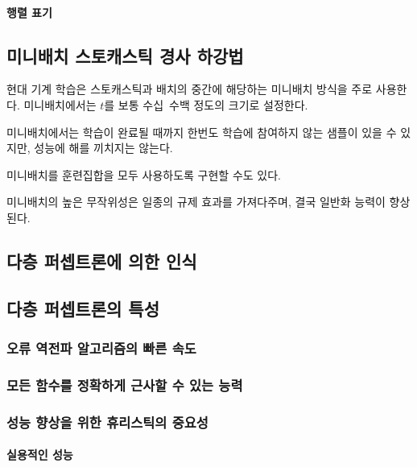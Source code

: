\documentclass [12pt] {oblivoir}
\let\oldsubsubsection=\subsubsection
\renewcommand{\subsubsection}
{
  \filbreak
  \oldsubsubsection
}
\begin{document}
\paragraph*{행렬 표기}\mbox{}

\subsection{미니배치 스토캐스틱 경사 하강법}

현대 기계 학습은 스토캐스틱과 배치의 중간에 해당하는 미니배치 방식을 주로 사용한다.
미니배치에서는 $t$를 보통 수십~수백 정도의 크기로 설정한다.

미니배치에서는 학습이 완료될 때까지 한번도 학습에 참여하지 않는 샘플이 있을 수 있지만, 성능에 해를 끼치지는 않는다.

미니배치를 훈련집합을 모두 사용하도록 구현할 수도 있다.

미니배치의 높은 무작위성은 일종의 규제 효과를 가져다주며, 결국 일반화 능력이 향상된다.

\subsection{다층 퍼셉트론에 의한 인식}

\subsection{다층 퍼셉트론의 특성}

\subsubsection{오류 역전파 알고리즘의 빠른 속도}

\subsubsection{모든 함수를 정확하게 근사할 수 있는 능력}

\subsubsection{성능 향상을 위한 휴리스틱의 중요성}

\paragraph*{실용적인 성능}\mbox{}

\vspace{3mm}
\end{document}
